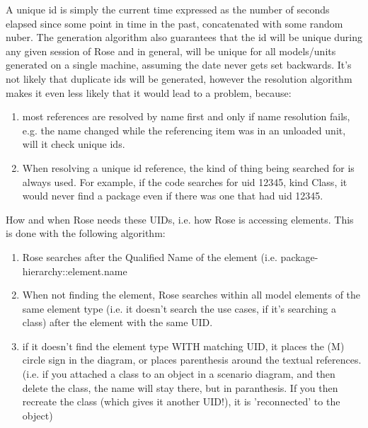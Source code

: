 \documentclass{article}
\begin{document}
A unique id is simply the current time expressed as the number of
seconds elapsed since some point in time in the past, concatenated
with some random nuber.  The generation algorithm also guarantees that
the id will be unique during any given session of Rose and in general,
will be unique for all models/units generated on a single machine,
assuming the date never gets set backwards.  It's not likely that
duplicate ids will be generated, however the resolution algorithm
makes it even less likely that it would lead to a problem, because:

\begin{enumerate}
\item most references are resolved by name first and only if name
  resolution fails, e.g. the name changed while the referencing item
  was in an unloaded unit, will it check unique ids.

\item When resolving a unique id reference, the kind of thing being
  searched for is always used.  For example, if the code searches for
  uid 12345, kind Class, it would never find a package even if there
  was one that had uid 12345.
\end{enumerate}
 
 How and when Rose needs these UIDs, i.e. how Rose is accessing
 elements. This is done with the following algorithm:
\begin{enumerate}
\item Rose searches after the Qualified Name of the element (i.e.
  package-hierarchy::element.name
  
\item When not finding the element, Rose searches within all model
  elements of the same element type (i.e. it doesn't search the use
  cases, if it's searching a class) after the element with the same
  UID.
  
\item if it doesn't find the element type WITH matching UID, it places
  the (M) circle sign in the diagram, or places parenthesis around the
  textual references.  (i.e. if you attached a class to an object in a
  scenario diagram, and then delete the class, the name will stay
  there, but in paranthesis. If you then recreate the class (which
  gives it another UID!), it is 'reconnected' to the object)
\end{enumerate}
\end{document}
